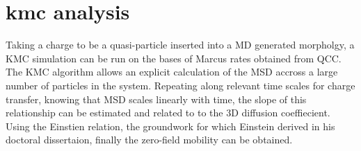 \section{\nobreak kmc analysis}
Taking a charge to be a quasi-particle inserted into a MD generated morpholgy, a KMC
simulation can be run on the bases of Marcus rates obtained from QCC.
The KMC algorithm allows an explicit calculation of the MSD accross a large number of 
particles in the system. Repeating along relevant time scales for 
charge transfer, knowing that MSD scales linearly with time, the slope of this relationship
can be estimated and related to to the 3D diffusion coeffiecient. Using the Einstien relation, 
the groundwork for which Einstein derived in his doctoral dissertaion, finally the zero-field
mobility can be obtained. 


